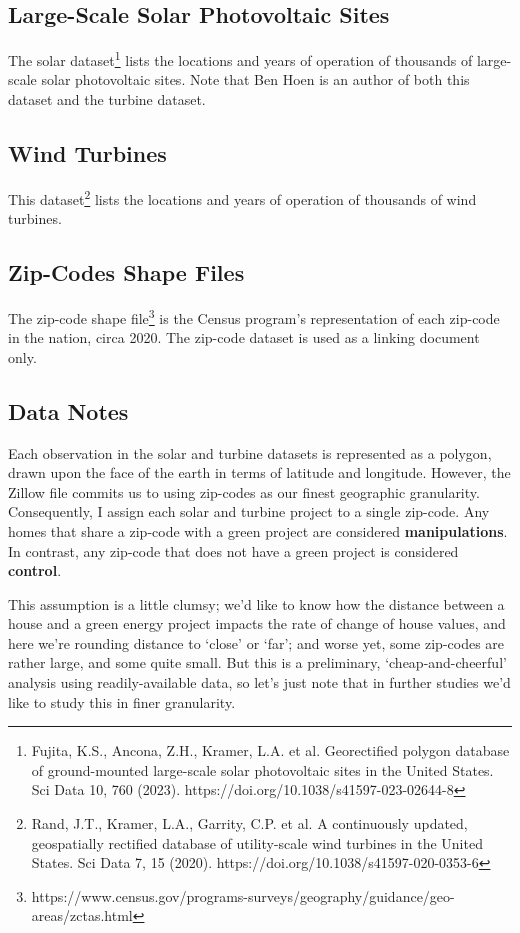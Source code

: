 \documentclass{article}
\begin{document}
\subsection{Large-Scale Solar Photovoltaic Sites}
The solar dataset\footnote{Fujita, K.S., Ancona, Z.H., Kramer, L.A. et al. Georectified polygon database of ground-mounted large-scale solar photovoltaic sites in the United States. Sci Data 10, 760 (2023). https://doi.org/10.1038/s41597-023-02644-8} lists the locations and years of operation of thousands of large-scale solar photovoltaic sites.
Note that Ben Hoen is an author of both this dataset and the turbine dataset.

\subsection{Wind Turbines}
This dataset\footnote{
Rand, J.T., Kramer, L.A., Garrity, C.P. et al. A continuously updated, geospatially rectified database of utility-scale wind turbines in the United States. Sci Data 7, 15 (2020). https://doi.org/10.1038/s41597-020-0353-6} lists the locations and years of operation of thousands of wind turbines.

\subsection{Zip-Codes Shape Files}
The zip-code shape file\footnote{https://www.census.gov/programs-surveys/geography/guidance/geo-areas/zctas.html} is the Census program's representation of each zip-code in the nation, circa 2020.
The zip-code dataset is used as a linking document only.


\subsection{Data Notes}

Each observation in the solar and turbine datasets is represented as a polygon, drawn upon the face of the earth in terms of latitude and longitude.
However, the Zillow file commits us to using zip-codes as our finest geographic granularity.
Consequently, I assign each solar and turbine project to a single zip-code. 
Any homes that share a zip-code with a green project are considered \textbf{manipulations}.
In contrast, any zip-code that does not have a green project is considered \textbf{control}.

This assumption is a little clumsy; we'd like to know how the distance between a house and a green energy project impacts the rate of change of house values, and here we're rounding distance to `close' or `far'; and worse yet, some zip-codes are rather large, and some quite small. 
But this is a preliminary, `cheap-and-cheerful' analysis using readily-available data, so let's just note that in further studies we'd like to study this in finer granularity.
\end{document}
